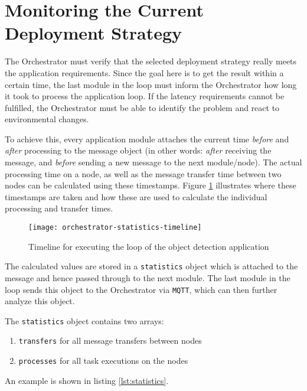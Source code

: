 \section{Monitoring the Current Deployment Strategy\label{sec:orchestrator-monitoring-deployment-strategy}}

The Orchestrator must verify that the selected deployment strategy really meets the application requirements.
Since the goal here is to get the result within a certain time, the last module in the loop must inform the Orchestrator how long it took to process the application loop.
If the latency requirements cannot be fulfilled, the Orchestrator must be able to identify the problem and react to environmental changes.

To achieve this, every application module attaches the current time \textit{before} and \textit{after} processing to the message object (in other words: \textit{after} receiving the message, and \textit{before} sending a new message to the next module/node).
The actual processing time on a node, as well as the message transfer time between two nodes can be calculated using these timestamps.
Figure \ref{fig:orchestrator-statistics-timeline} illustrates where these timestamps are taken and how these are used to calculate the individual processing and transfer times.

\begin{figure}[h]
    \centering
    \texttt{[image: orchestrator-statistics-timeline]}
    \caption{Timeline for executing the loop of the object detection application}
    \label{fig:orchestrator-statistics-timeline}
\end{figure}

The calculated values are stored in a \texttt{statistics} object which is attached to the message and hence passed through to the next module.
The last module in the loop sends this object to the Orchestrator via \texttt{MQTT}, which can then further analyze this object.

The \texttt{statistics} object contains two arrays:
\begin{enumerate}
    \item \texttt{transfers} for all message transfers between nodes
    \item \texttt{processes} for all task executions on the nodes
\end{enumerate}

An example is shown in listing \ref{lst:statistics}.



